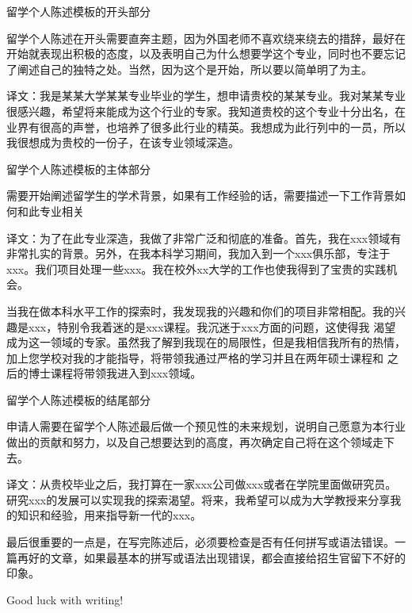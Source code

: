 \documentclass{statementCN}
\begin{document}
\maketitle

留学个人陈述模板的开头部分

留学个人陈述在开头需要直奔主题，因为外国老师不喜欢绕来绕去的措辞，最好在开始就表现出积极的态度，以及表明自己为什么想要学这个专业，同时也不要忘记了阐述自己的独特之处。当然，因为这个是开始，所以要以简单明了为主。

译文：我是某某大学某某专业毕业的学生，想申请贵校的某某专业。我对某某专业很感兴趣，希望将来能成为这个行业的专家。我知道贵校的这个专业十分出名，在业界有很高的声誉，也培养了很多此行业的精英。我想成为此行列中的一员，所以我很想成为贵校的一份子，在该专业领域深造。

留学个人陈述模板的主体部分

需要开始阐述留学生的学术背景，如果有工作经验的话，需要描述一下工作背景如何和此专业相关

译文：为了在此专业深造，我做了非常广泛和彻底的准备。首先，我在xxx领域有非常扎实的背景。另外，在我本科学习期间，我加入到一个xxx俱乐部，专注于 xxx。我们项目处理一些xxx。我在校外xx大学的工作也使我得到了宝贵的实践机会。

当我在做本科水平工作的探索时，我发现我的兴趣和你们的项目非常相配。我的兴趣是xxx，特别令我着迷的是xxx课程。我沉迷于xxx方面的问题，这使得我 渴望成为这一领域的专家。虽然我了解到我现在的局限性，但是我相信我所有的热情，加上您学校对我的才能指导，将带领我通过严格的学习并且在两年硕士课程和 之后的博士课程将带领我进入到xxx领域。

留学个人陈述模板的结尾部分

申请人需要在留学个人陈述最后做一个预见性的未来规划，说明自己愿意为本行业做出的贡献和努力，以及自己想要达到的高度，再次确定自己将在这个领域走下去。

译文：从贵校毕业之后，我打算在一家xxx公司做xxx或者在学院里面做研究员。研究xxx的发展可以实现我的探索渴望。将来，我希望可以成为大学教授来分享我的知识和经验，用来指导新一代的xxx。

最后很重要的一点是，在写完陈述后，必须要检查是否有任何拼写或语法错误。一篇再好的文章，如果最基本的拼写或语法出现错误，都会直接给招生官留下不好的印象。

Good luck with writing!
\end{document}
